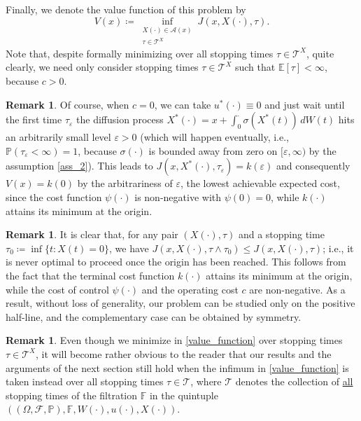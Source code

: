 \documentclass[11pt,tbtags,reqno]{article}
\theoremstyle{definition}
\newtheorem{remark}[Th]{Remark}
\numberwithin{equation}{section}
\theoremstyle{definition}
\newcommand{\pr}{\mathbb{P}}
\newcommand{\ex}{\mathbb{E}}
\newcommand{\eps}{\varepsilon}
\begin{document}
Finally, we denote the value function of this problem by
\begin{equation}\label{value_function}
    V(x) \coloneqq \inf\limits_{\substack{X(\cdot) \in \mathcal{A}(x) \\ \tau \in \mathcal{T}^X}} J(x, X(\cdot), \tau).
\end{equation}
Note that, despite formally minimizing over all stopping times $\tau \in \mathcal{T}^X$, quite clearly, we need only consider stopping times $\tau \in \mathcal{T}^X$ such that $\ex[\tau] < \infty$, because $c > 0$.

\begin{remark}
    Of course, when $c = 0$, we can take $u^*(\cdot) \equiv 0$ and just wait until the first time $\tau_\eps$ the diffusion process $X^*(\cdot) = x + \int_0^\cdot \sigma(X^*(t)) \, dW(t)$ hits an arbitrarily small level $\eps > 0$ (which will happen eventually, i.e., $\pr(\tau_\eps < \infty) = 1$, because $\sigma(\cdot)$ is bounded away from zero on $[\eps, \infty)$ by the assumption \ref{ass_2}). This leads to $J(x, X^*(\cdot), \tau_\eps) = k(\eps)$ and consequently $V(x) = k(0)$ by the arbitrariness of $\eps$, the lowest achievable expected cost, since the cost function $\psi(\cdot)$ is non-negative with $\psi(0) = 0$, while $k(\cdot)$ attains its minimum at the origin.
\end{remark}

\begin{remark}\label{remark_wlog_positive}
    It is clear that, for any pair $(X(\cdot), \tau)$ and a stopping time $\tau_0 \coloneqq \inf\{t: X(t) = 0\}$, we have  $J(x, X(\cdot), \tau \wedge \tau_0) \le J(x, X(\cdot), \tau)$; i.e., it is never optimal to proceed once the origin has been reached. This follows from the fact that the terminal cost function $k(\cdot)$ attains its minimum at the origin, while the cost of control $\psi(\cdot)$ and the operating cost $c$ are non-negative. As a result,
    without loss of generality, our problem can be studied only on the positive half-line, and the complementary case can be obtained by symmetry.
\end{remark}

\begin{remark}
    Even though we minimize in \eqref{value_function} over stopping times $\tau \in \mathcal{T}^X$, it will become rather obvious to the reader that our results and the arguments of the next section still hold when the infimum in \eqref{value_function} is taken instead over all stopping times $\tau \in \mathcal{T}$, where $\mathcal{T}$ denotes the collection of \underline{all} stopping times of the filtration $\mathbb{F}$ in the quintuple $\left((\Omega, \mathcal{F}, \pr), \mathbb{F}, W(\cdot), u(\cdot), X(\cdot) \right)$. 
\end{remark} 
\end{document}
